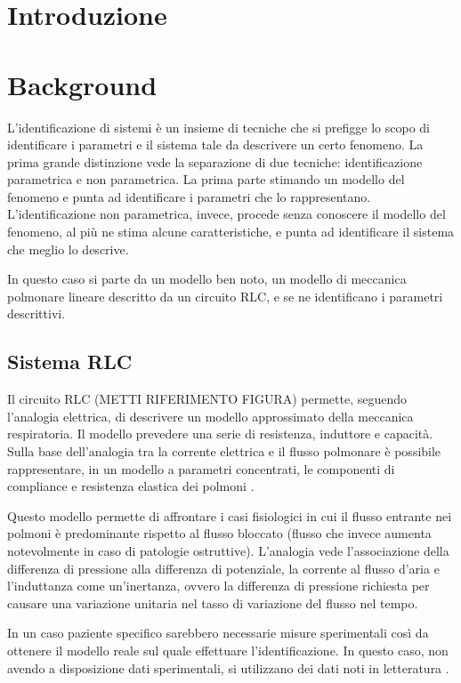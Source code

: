 \section{Introduzione}
\lipsum[1-2]
\section{Background}

L'identificazione di sistemi è un insieme di tecniche che si prefigge lo scopo di identificare i parametri e il sistema tale da descrivere un certo fenomeno. La prima grande distinzione vede la separazione di due tecniche: identificazione parametrica e non parametrica. La prima parte stimando un modello del fenomeno e punta ad identificare i parametri che lo rappresentano. L'identificazione non parametrica, invece, procede senza conoscere il modello del fenomeno, al più ne stima alcune caratteristiche, e punta ad identificare il sistema che meglio lo descrive.

In questo caso si parte da un modello ben noto, un modello di meccanica polmonare lineare descritto da un circuito RLC, e se ne identificano i parametri descrittivi.

\subsection{Sistema RLC}

Il circuito RLC (METTI RIFERIMENTO FIGURA) permette, seguendo l'analogia elettrica, di descrivere un modello approssimato della meccanica respiratoria. Il modello prevedere una serie di resistenza, induttore e capacità. Sulla base dell'analogia tra la corrente elettrica e il flusso polmonare è possibile rappresentare, in un modello a parametri concentrati, le componenti di compliance e resistenza elastica dei polmoni \cite{ghafarian_review_nodate}. 

Questo modello permette di affrontare i casi fisiologici in cui il flusso entrante nei polmoni è predominante rispetto al flusso bloccato (flusso che invece aumenta notevolmente in caso di patologie ostruttive). L'analogia vede l'associazione della differenza di pressione alla differenza di potenziale, la corrente al flusso d'aria e l'induttanza come un'inertanza, ovvero la differenza di pressione richiesta per causare una variazione unitaria nel tasso di variazione del flusso nel tempo. 

In un caso paziente specifico sarebbero necessarie misure sperimentali così da ottenere il modello reale sul quale effettuare l'identificazione. In questo caso, non avendo a disposizione dati sperimentali, si utilizzano dei dati noti in letteratura \cite{khoo_physiological_2018}. 

